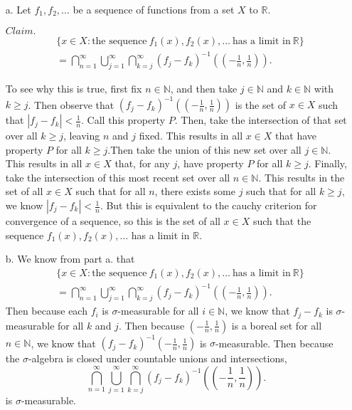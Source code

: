 \documentclass[12pt]{article}
\begin{document}
\begin{itemize}
    \item[a.] Let $f_1, f_2,\ldots$ be a sequence of functions from a set $X$ to $\mathbb{R}$.
    
    $Claim.$
    \begin{align*}
        & \{x \in X : \text{the sequence}~ f_1(x), f_2(x), \ldots ~\text{has a limit in}~ \mathbb{R}\} \\
        &= \bigcap_{n=1}^\infty \bigcup_{j=1}^\infty \bigcap_{k=j}^\infty (f_j - f_k)^{-1}((-\frac{1}{n}, \frac{1}{n})).
    \end{align*}
    
    To see why this is true, first fix $n \in \mathbb{N}$, and then take $j \in \mathbb{N}$ and $k \in \mathbb{N}$ with $k \geq j$. Then observe that $(f_j - f_k)^{-1}((-\frac{1}{n}, \frac{1}{n}))$ is the set of $x \in X$ such that $|f_j - f_k| < \frac{1}{n}$. Call this property $P$. Then, take the intersection of that set over all $k \geq j$, leaving $n$ and $j$ fixed. This results in all $x \in X$ that have property $P$ for all $k \geq j$.Then take the union of this new set over all $j \in \mathbb{N}$. This results in all $x \in X$ that, for any $j$, have property $P$ for all $k \geq j$. Finally, take the intersection of this most recent set over all $n \in \mathbb{N}$. This results in the set of all $x \in X$ such that for all $n$, there exists some $j$ such that for all $k \geq j$, we know $|f_j - f_k| < \frac{1}{n}$. But this is equivalent to the cauchy criterion for convergence of a sequence, so this is the set of all $x \in X$ such that the sequence $f_1(x), f_2(x), \ldots$ has a limit in $\mathbb{R}$.

    \item[b.] We know from part a. that
    \begin{align*}
        & \{x \in X : \text{the sequence}~ f_1(x), f_2(x), \ldots ~\text{has a limit in}~ \mathbb{R}\} \\
        &= \bigcap_{n=1}^\infty \bigcup_{j=1}^\infty \bigcap_{k=j}^\infty (f_j - f_k)^{-1}((-\frac{1}{n}, \frac{1}{n})).
    \end{align*}
    Then because each $f_i$ is $\sigma$-measurable for all $i \in \mathbb{N}$, we know that $f_j - f_k$ is $\sigma$-measurable for all $k$ and $j$. Then because $(-\frac{1}{n}, \frac{1}{n})$ is a boreal set for all $n \in \mathbb{N}$, we know that $(f_j - f_k)^{-1} (-\frac{1}{n}, \frac{1}{n})$ is $\sigma$-measurable. Then because the $\sigma$-algebra is closed under countable unions and intersections,$$\bigcap_{n=1}^\infty \bigcup_{j=1}^\infty \bigcap_{k=j}^\infty (f_j - f_k)^{-1}((-\frac{1}{n}, \frac{1}{n})).$$ is $\sigma$-measurable.
\end{itemize}
\end{document}
